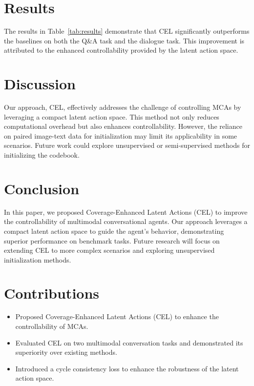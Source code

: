 \documentclass[12pt]{article}
\begin{document}
\section{Results}
The results in Table~\ref{tab:results} demonstrate that CEL significantly outperforms the baselines on both the Q&A task and the dialogue task. This improvement is attributed to the enhanced controllability provided by the latent action space.

\section{Discussion}
Our approach, CEL, effectively addresses the challenge of controlling MCAs by leveraging a compact latent action space. This method not only reduces computational overhead but also enhances controllability. However, the reliance on paired image-text data for initialization may limit its applicability in some scenarios. Future work could explore unsupervised or semi-supervised methods for initializing the codebook.

\section{Conclusion}
In this paper, we proposed Coverage-Enhanced Latent Actions (CEL) to improve the controllability of multimodal conversational agents. Our approach leverages a compact latent action space to guide the agent's behavior, demonstrating superior performance on benchmark tasks. Future research will focus on extending CEL to more complex scenarios and exploring unsupervised initialization methods.

\section{Contributions}
\begin{itemize}
    \item Proposed Coverage-Enhanced Latent Actions (CEL) to enhance the controllability of MCAs.
    \item Evaluated CEL on two multimodal conversation tasks and demonstrated its superiority over existing methods.
    \item Introduced a cycle consistency loss to enhance the robustness of the latent action space.
\end{itemize}
\end{document}
